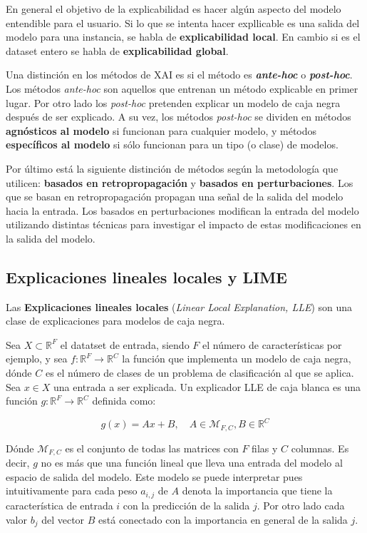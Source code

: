 En general el objetivo de la explicabilidad es hacer algún aspecto del modelo entendible para el usuario. Si lo que se intenta hacer expllicable es una salida del modelo para una instancia, se habla de \textbf{explicabilidad local}. En cambio si es el dataset entero se habla de \textbf{explicabilidad global}.

Una distinción en los métodos de XAI es si el método es \textit{\textbf{ante-hoc}} o \textit{\textbf{post-hoc}}. Los métodos \textit{ante-hoc} son aquellos que entrenan un método explicable en primer lugar. Por otro lado los \textit{post-hoc} pretenden explicar un modelo de caja negra después de ser explicado. A su vez, los métodos \textit{post-hoc} se dividen en métodos \textbf{agnósticos al modelo} si funcionan para cualquier modelo, y métodos \textbf{específicos al modelo} si sólo funcionan para un tipo (o clase) de modelos.

Por último está la siguiente distinción de métodos según la metodología que utilicen: \textbf{basados en retropropagación} y \textbf{basados en perturbaciones}. Los que se basan en retropropagación propagan una señal de la salida del modelo hacia la entrada. Los basados en perturbaciones modifican la entrada del modelo utilizando distintas técnicas para investigar el impacto de estas modificaciones en la salida del modelo.


\subsection{Explicaciones lineales locales y LIME}

Las \textbf{Explicaciones lineales locales} (\textit{Linear Local Explanation, LLE}) \cite{REVEL,LIME} son una clase de explicaciones para modelos de caja negra.

 Sea $X \subset \mathbb{R}^F$ el datatset de entrada, siendo $F$ el número de características por ejemplo, y sea $f : \mathbb{R}^F \rightarrow \mathbb{R}^C$ la función que implementa un modelo de caja negra, dónde $C$ es el número de clases de un problema de clasificación al que se aplica. Sea $x\in X$ una entrada a ser explicada. Un explicador LLE de caja blanca es una función $g: \mathbb{R}^F \rightarrow \mathbb{R}^C$ definida como:
 
\begin{equation}
g(x) = Ax + B, \quad A \in \mathcal{M}_{F,C}, B \in \mathbb{R}^C
\end{equation}

Dónde $\mathcal{M}_{F,C}$ es el conjunto de todas las matrices con $F$ filas y $C$ columnas. Es decir, $g$ no es más que una función lineal que lleva una entrada del modelo al espacio de salida del modelo. Este modelo se puede interpretar pues intuitivamente para cada peso $a_{i,j}$ de $A$ denota la importancia que tiene la característica de entrada $i$ con la predicción de la salida $j$. Por otro lado cada valor $b_j$ del vector $B$ está conectado con la importancia en general de la salida $j$.

